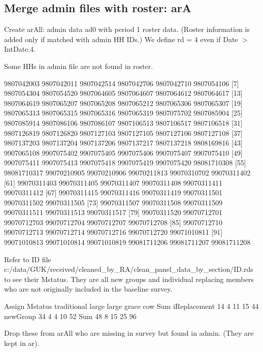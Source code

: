\subsection{Merge admin files with roster: \textsf{arA}}

Create \textsf{arAll}: admin data \textsf{ad0} with period 1 roster data. (Roster information is added only if matched with admin HH IDs.) We define rd = 4 even if Date $>$ IntDate.4.

Some HHs in admin file are not found in roster. 
\begin{Schunk}
\begin{Soutput}
 [1]  9807042003  9807042011  9807042514  9807042706  9807042710  9807054106
 [7]  9807054304  9807054520  9807064605  9807064607  9807064612  9807064617
[13]  9807064619  9807065207  9807065208  9807065212  9807065306  9807065307
[19]  9807065313  9807065315  9807065316  9807065319  9807075702  9807085904
[25]  9807085914  9807086106  9807086107  9807106513  9807106517  9807106518
[31]  9807126819  9807126820  9807127103  9807127105  9807127106  9807127108
[37]  9807137203  9807137204  9807137206  9807137217  9807137218  9808169816
[43]  9907065108  9907075402  9907075405  9907075406  9907075407  9907075410
[49]  9907075411  9907075413  9907075418  9907075419  9907075420 98081710308
[55] 98081710317 99070210905 99070210906 99070211813 99070310702 99070311402
[61] 99070311403 99070311405 99070311407 99070311408 99070311411 99070311412
[67] 99070311415 99070311416 99070311419 99070311501 99070311502 99070311505
[73] 99070311507 99070311508 99070311509 99070311511 99070311513 99070311517
[79] 99070311520 99070712701 99070712703 99070712704 99070712707 99070712708
[85] 99070712710 99070712713 99070712714 99070712716 99070712720 99071010811
[91] 99071010813 99071010814 99071010819 99081711206 99081711207 99081711208
\end{Soutput}
\end{Schunk}
Refer to ID file {\footnotesize c:/data/GUK/received/cleaned\_by\_RA/clean\_panel\_data\_by\_section/ID.rds} to see their \textsf{Mstatus}. They are all new groups and individual replacing members who are not originally included in the baseline survey.
\begin{Schunk}
\begin{Soutput}
              Assign
Mstatus        traditional large large grace cow Sum
  iReplacement          14     4          11  15  44
  newGroup              34     4           4  10  52
  Sum                   48     8          15  25  96
\end{Soutput}
\end{Schunk}
Drop these from \textsf{arAll} who are missing in survey but found in admin. (They are kept in \textsf{ar}). \gobblepars

